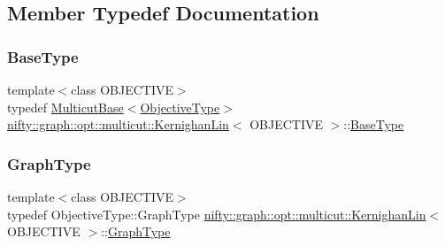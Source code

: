\subsection{Member Typedef Documentation}
\mbox{\label{classnifty_1_1graph_1_1opt_1_1multicut_1_1KernighanLin_a96e5bc228534b70abd37a564cfb38396}} 
\subsubsection{\texorpdfstring{Base\+Type}{BaseType}}
{\footnotesize\ttfamily template$<$class O\+B\+J\+E\+C\+T\+I\+VE$>$ \\
typedef \hyperlink{classnifty_1_1graph_1_1opt_1_1multicut_1_1MulticutBase}{Multicut\+Base}$<$\hyperlink{classnifty_1_1graph_1_1opt_1_1multicut_1_1KernighanLin_aa5a1c5a577ff9d17db32d5871da3ed45}{Objective\+Type}$>$ \hyperlink{classnifty_1_1graph_1_1opt_1_1multicut_1_1KernighanLin}{nifty\+::graph\+::opt\+::multicut\+::\+Kernighan\+Lin}$<$ O\+B\+J\+E\+C\+T\+I\+VE $>$\+::\hyperlink{classnifty_1_1graph_1_1opt_1_1multicut_1_1KernighanLin_a96e5bc228534b70abd37a564cfb38396}{Base\+Type}}

\mbox{\label{classnifty_1_1graph_1_1opt_1_1multicut_1_1KernighanLin_ace439723d2d7a3f596e92c38cff2e964}} 
\subsubsection{\texorpdfstring{Graph\+Type}{GraphType}}
{\footnotesize\ttfamily template$<$class O\+B\+J\+E\+C\+T\+I\+VE$>$ \\
typedef Objective\+Type\+::\+Graph\+Type \hyperlink{classnifty_1_1graph_1_1opt_1_1multicut_1_1KernighanLin}{nifty\+::graph\+::opt\+::multicut\+::\+Kernighan\+Lin}$<$ O\+B\+J\+E\+C\+T\+I\+VE $>$\+::\hyperlink{classnifty_1_1graph_1_1opt_1_1multicut_1_1KernighanLin_ace439723d2d7a3f596e92c38cff2e964}{Graph\+Type}}

